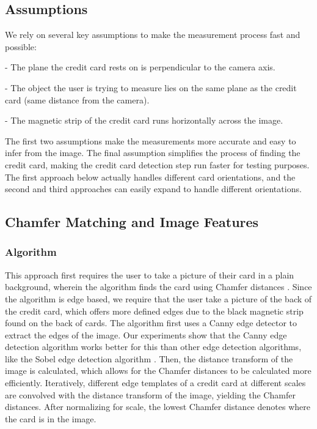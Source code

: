 \documentclass[10pt,twocolumn,letterpaper]{article}
\begin{document}
\subsection{Assumptions}

	We rely on several key assumptions to make the measurement process fast and possible:


- The plane the credit card rests on is perpendicular to the camera axis.

- The object the user is trying to measure lies on the same plane as the credit card (same distance from the camera). 

- The magnetic strip of the credit card runs horizontally across the image.


The first two assumptions make the measurements more accurate and easy to infer from the image. The final assumption simplifies the process of finding the credit card, making the credit card detection step run faster for testing purposes. The first approach below actually handles different card orientations, and the second and third approaches can easily expand to handle different orientations. 

\subsection{Chamfer Matching and Image Features}
\subsubsection{Algorithm}
This approach first requires the user to take a picture of their card in a plain background, wherein the algorithm finds the card using Chamfer distances \cite{chamfer}. Since the algorithm is edge based, we require that the user take a picture of the back of the credit card, which offers more defined edges due to the black magnetic strip found on the back of cards. The algorithm first uses a Canny edge detector to extract the edges of the image. Our experiments show that the Canny edge detection algorithm works better for this than other edge detection algorithms, like the Sobel edge detection algorithm \cite{canny}. Then, the distance transform of the image is calculated, which allows for the Chamfer distances to be calculated more efficiently. Iteratively, different edge templates of a credit card at different scales are convolved with the distance transform of the image, yielding the Chamfer distances. After normalizing for scale, the lowest Chamfer distance denotes where the card is in the image.
\end{document}
